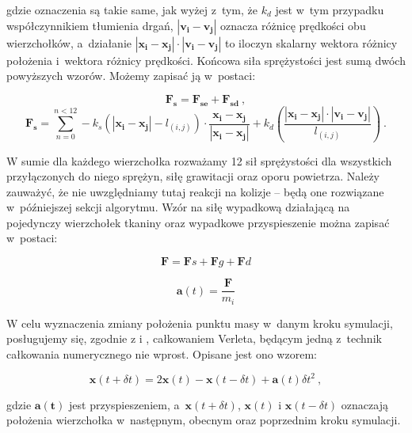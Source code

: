 			gdzie oznaczenia są takie same, jak wyżej z~tym, że \(k_{d}\) jest w~tym przypadku współczynnikiem tłumienia drgań, \(|\mathbf{v_{i}} - \mathbf{v_{j}}|\) oznacza różnicę prędkości obu wierzchołków, a~działanie \(|\mathbf{x_{i}} - \mathbf{x_{j}}| \cdot |\mathbf{v_{i}} - \mathbf{v_{j}}|\) to iloczyn skalarny wektora różnicy położenia i~wektora różnicy prędkości. Końcowa siła sprężystości jest sumą dwóch powyższych wzorów. Możemy zapisać ją w~postaci:
			
			\begin{equation}
			\mathbf{F_{s}} = \mathbf{F_{se}} + \mathbf{F_{sd}} \ ,
			\end{equation}
			\begin{equation}
			\mathbf{F_{s}} = \sum_{n = 0}^{n < 12} - k_{s} (|\mathbf{x_{i}} - \mathbf{x_{j}}| - l_{(i, j)}) \cdot \frac{\mathbf{x_{i}} - \mathbf{x_{j}}}{|\mathbf{x_{i}} - \mathbf{x_{j}}|} + k_{d}(\frac{|\mathbf{x_{i}} - \mathbf{x_{j}}| \cdot |\mathbf{v_{i}} - \mathbf{v_{j}}|}{l_{(i, j)}}) \ .
			\end{equation}
			
			W sumie dla każdego wierzchołka rozważamy 12 sił sprężystości dla wszystkich przyłączonych do niego sprężyn, siłę grawitacji oraz oporu powietrza. Należy zauważyć, że nie uwzględniamy tutaj reakcji na kolizje -- będą one rozwiązane w~późniejszej sekcji algorytmu. Wzór na siłę wypadkową działającą na pojedynczy wierzchołek tkaniny oraz wypadkowe przyspieszenie można zapisać w~postaci:
			
			\begin{equation}
			\mathbf{F} = \mathbf{F}{s} + \mathbf{F}{g} + \mathbf{F}{d}		
			\end{equation}
			
			\begin{equation}
			\mathbf{a}(t) = \frac{\mathbf{F}}{m_{i}}	
			\end{equation}
			
			W celu wyznaczenia zmiany położenia punktu masy w~danym kroku symulacji, posługujemy się, zgodnie z \cite{cloth-dobre-wzory} i \cite{receptury}, całkowaniem Verleta, będącym jedną z~technik całkowania numerycznego nie wprost. Opisane jest ono wzorem:
			
			\begin{equation}
			\mathbf{x}(t + \delta t) = 2\mathbf{x}(t) - \mathbf{x}(t - \delta t) + \mathbf{a}(t) \delta t^{2} \ ,		
			\end{equation}
			
			gdzie \(\mathbf{a(t)}\) jest przyspieszeniem, a~\(\mathbf{x}(t + \delta t)\), \(\mathbf{x}(t)\) i \(\mathbf{x}(t - \delta t)\) oznaczają położenia wierzchołka w~następnym, obecnym oraz poprzednim kroku symulacji. 
			
